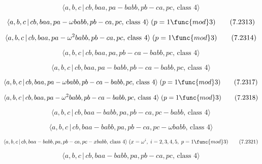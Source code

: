 \documentclass[10pt]{article}
\begin{document}
\begin{equation}
\langle a,b,c\,|\,cb,baa,pa-babb,pb-ca,pc,\,\text{class }4\rangle 
\tag{7.2312}
\end{equation}

\begin{equation}
\langle a,b,c\,|\,cb,baa,pa-\omega babb,pb-ca,pc,\,\text{class }4\rangle
\;(p=1\func{mod}3)  \tag{7.2313}
\end{equation}

\begin{equation}
\langle a,b,c\,|\,cb,baa,pa-\omega ^{2}babb,pb-ca,pc,\,\text{class }4\rangle
\;(p=1\func{mod}3)  \tag{7.2314}
\end{equation}

\begin{equation}
\langle a,b,c\,|\,cb,baa,pa,pb-ca-babb,pc,\,\text{class }4\rangle 
\tag{7.2315}
\end{equation}

\begin{equation}
\langle a,b,c\,|\,cb,baa,pa-babb,pb-ca-babb,pc,\,\text{class }4\rangle 
\tag{7.2316}
\end{equation}

\begin{equation}
\langle a,b,c\,|\,cb,baa,pa-\omega babb,pb-ca-babb,pc,\,\text{class }%
4\rangle \;(p=1\func{mod}3)  \tag{7.2317}
\end{equation}

\begin{equation}
\langle a,b,c\,|\,cb,baa,pa-\omega ^{2}babb,pb-ca-babb,pc,\,\text{class }%
4\rangle \;(p=1\func{mod}3)  \tag{7.2318}
\end{equation}

\begin{equation}
\langle a,b,c\,|\,cb,baa-babb,pa,pb-ca,pc-babb,\,\text{class }4\rangle 
\tag{7.2319}
\end{equation}

\begin{equation}
\langle a,b,c\,|\,cb,baa-babb,pa,pb-ca,pc-\omega babb,\,\text{class }4\rangle
\tag{7.2320}
\end{equation}

\begin{equation}
\langle a,b,c\,|\,cb,baa-babb,pa,pb-ca,pc-xbabb,\,\text{class }4\rangle
\;(x=\omega ^{i},\;i=2,3,4,5,\;p=1\func{mod}3)  \tag{7.2321}
\end{equation}

\begin{equation}
\langle a,b,c\,|\,cb,baa-babb,pa,pb-ca,pc,\,\text{class }4\rangle 
\tag{7.2322}
\end{equation}
\end{document}

